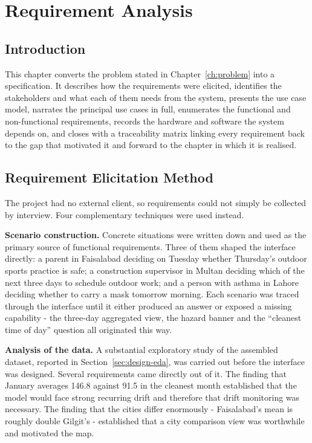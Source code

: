 \chapter{Requirement Analysis}
\label{ch:requirements}

\section{Introduction}
This chapter converts the problem stated in Chapter~\ref{ch:problem} into a
specification. It describes how the requirements were elicited, identifies the
stakeholders and what each of them needs from the system, presents the use case
model, narrates the principal use cases in full, enumerates the functional and
non-functional requirements, records the hardware and software the system
depends on, and closes with a traceability matrix linking every requirement back
to the gap that motivated it and forward to the chapter in which it is realised.

\section{Requirement Elicitation Method}
The project had no external client, so requirements could not simply be
collected by interview. Four complementary techniques were used instead.

\textbf{Scenario construction.} Concrete situations were written down and used as
the primary source of functional requirements. Three of them shaped the interface
directly: a parent in Faisalabad deciding on Tuesday whether Thursday's outdoor
sports practice is safe; a construction supervisor in Multan deciding which of
the next three days to schedule outdoor work; and a person with asthma in Lahore
deciding whether to carry a mask tomorrow morning. Each scenario was traced
through the interface until it either produced an answer or exposed a missing
capability - the three-day aggregated view, the hazard banner and the ``cleanest
time of day'' question all originated this way.

\textbf{Analysis of the data.} A substantial exploratory study of the assembled
dataset, reported in Section~\ref{sec:design-eda}, was carried out before the
interface was designed. Several requirements came directly out of it. The finding
that January averages 146.8 against 91.5 in the cleanest month established that
the model would face strong recurring drift and therefore that drift monitoring
was necessary. The finding that the cities differ enormously - Faisalabad's mean
is roughly double Gilgit's - established that a city comparison view was
worthwhile and motivated the map.


